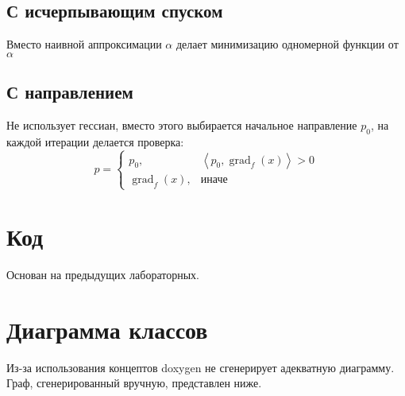 \documentclass[russian, english]{article}
\newcommand{\mydot}[2]{\left\langle#1,#2\right\rangle}
\begin{document}
\subsection{С исчерпывающим спуском}
Вместо наивной аппроксимации $\alpha$ делает минимизацию одномерной функции от $\alpha$
\subsection{С направлением}
Не использует гессиан, вместо этого выбирается начальное направление $p_0$, на каждой итерации делается проверка:\\
$$
p = \begin{cases}
	p_0, & \mydot{p_0}{\operatorname{grad}_f(x)} > 0\\
	\operatorname{grad}_f(x), & \text{иначе}
\end{cases}
$$

\newpage
\appendix
\section{Код}
Основан на предыдущих лабораторных.

\section{Диаграмма классов}
Из-за использования концептов doxygen не сгенерирует адекватную диаграмму. Граф, сгенерированный вручную, представлен ниже. \\
\noindent{}
%
\end{document}
